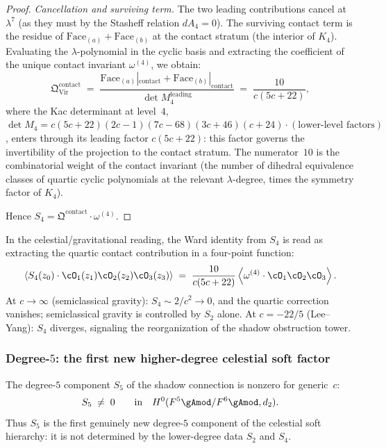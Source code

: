 \begin{proof}
\emph{Cancellation and surviving term.}
The two leading contributions cancel at $\lambda^7$
(as they must by the Stasheff relation $dA_4 = 0$).
The surviving contact term is the residue of
$\text{Face}_{(a)} + \text{Face}_{(b)}$ at the contact
stratum (the interior of $K_4$). Evaluating the
$\lambda$-polynomial in the cyclic basis and extracting the
coefficient of the unique contact invariant
$\omega^{(4)}$, we obtain:
\[
\mathfrak{Q}^{\mathrm{contact}}_{\mathrm{Vir}}
\;=\;
\frac{
 \text{Face}_{(a)}|_{\mathrm{contact}}
 + \text{Face}_{(b)}|_{\mathrm{contact}}
}{
 \det M_4^{\mathrm{leading}}
}
\;=\;
\frac{10}{c(5c+22)},
\]
where the Kac determinant at level~$4$,
$\det M_4 = c(5c+22)(2c-1)(7c-68)(3c+46)(c+24)
\cdot (\text{lower-level factors})$,
enters through its leading factor $c(5c+22)$: this factor
governs the invertibility of the projection to the contact
stratum. The numerator~$10$ is the combinatorial weight
of the contact invariant (the number of dihedral equivalence
classes of quartic cyclic polynomials at the relevant
$\lambda$-degree, times the symmetry factor of $K_4$).

Hence $S_4 = \mathfrak{Q}^{\mathrm{contact}} \cdot
\omega^{(4)}$.
\end{proof}

In the celestial/gravitational reading, the Ward identity from
$S_4$ is read as extracting the quartic contact contribution in a
four-point function:
\begin{equation}\label{eq:quartic-soft-ward}
\left\langle
 S_4(z_0) \cdot
 \cO_1(z_1)\cO_2(z_2)\cO_3(z_3)
\right\rangle
\;=\;
\frac{10}{c(5c+22)}
\left\langle
 \omega^{(4)} \cdot
 \cO_1\cO_2\cO_3
\right\rangle.
\end{equation}
At $c \to \infty$ (semiclassical gravity): $S_4 \sim 2/c^2
\to 0$, and the quartic correction vanishes; semiclassical
gravity is controlled by $S_2$ alone. At $c = -22/5$
(Lee--Yang): $S_4$ diverges, signaling the reorganization of
the shadow obstruction tower.

\subsubsection*{Degree-$5$: the first new higher-degree celestial soft factor}

\begin{theorem}
\label{thm:gravity-quintic-soft}
The degree-$5$ component $S_5$ of the shadow connection is
nonzero for generic~$c$:
\begin{equation}\label{eq:gravity-S5-nonzero}
S_5 \;\ne\; 0
\qquad\text{in}\quad
H^0(F^5\gAmod/F^6\gAmod, d_2).
\end{equation}
Thus $S_5$ is the first genuinely new degree-$5$ component of the
celestial soft hierarchy: it is not determined by the lower-degree
data $S_2$ and $S_4$.
\end{theorem}

